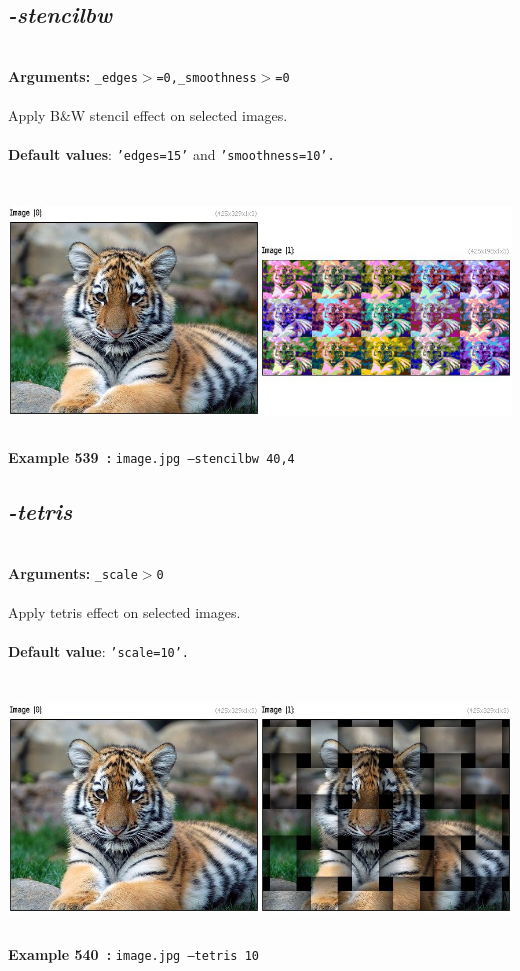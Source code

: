 \documentclass[a4paper,11pt,twoside]{book}
\begin{document}
\subsection{\emph{-stencilbw} }\vspace*{-0.5em}
~\\\textbf{Arguments: } 
{\small \texttt{\_edges$>$=0,\_smoothness$>$=0}}\\~\\
Apply B\&W stencil effect on selected images.
~\\~\\\textbf{Default values}: {\small \texttt{'edges=15'} and \texttt{'smoothness=10'.}}
\begin{center}\includegraphics[keepaspectratio=true,height=7cm,width=\textwidth]{img/gmic_def539.jpg}\\
{\footnotesize \textbf{Example 539~:} \texttt{image.jpg --stencilbw 40,4}}
\end{center}

\subsection{\emph{-tetris} }\vspace*{-0.5em}
~\\\textbf{Arguments: } 
{\small \texttt{\_scale$>$0}}\\~\\
Apply tetris effect on selected images.
~\\~\\\textbf{Default value}: {\small \texttt{'scale=10'.}}
\begin{center}\includegraphics[keepaspectratio=true,height=7cm,width=\textwidth]{img/gmic_def540.jpg}\\
{\footnotesize \textbf{Example 540~:} \texttt{image.jpg --tetris 10}}
\end{center}
\end{document}
